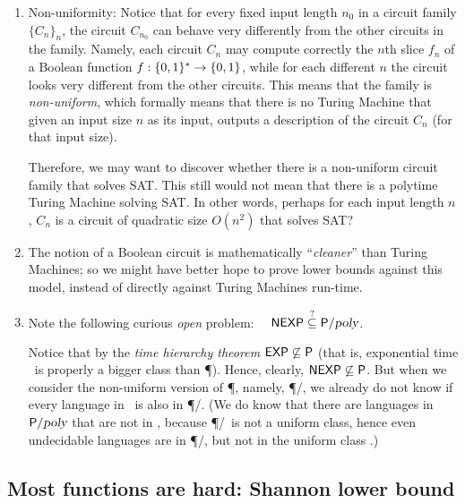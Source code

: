 \begin{enumerate}
\item  Non-uniformity: Notice that for every fixed input length $n_0$ in a circuit family $\{C_n\}_n$, the circuit $C_{n_0}$ can behave very differently from the other circuits in the family. Namely, each circuit $C_n$ may compute correctly the $n$th slice $f_n$ of a Boolean function $f:\{0,1\}^*\to\{0,1\}$, while for each different $n$ the circuit looks very different from the other circuits. This means that the family is \emph{non-uniform}, which  formally means that there is no Turing Machine that given an input size $n$ as its input, outputs a description of the circuit $C_n$ (for that input size). 

Therefore, we may want to discover whether there is a non-uniform circuit family that solves SAT. This still would not mean that there is a polytime Turing Machine solving SAT. In other words, perhaps for each input length $n$, $C_n$ is a circuit of quadratic size $O(n^2)$ that solves SAT?


\item The notion of a Boolean circuit is mathematically ``\textit{cleaner}'' than Turing Machines; so we might have better hope to prove lower bounds against this model, instead of directly against Turing Machines run-time. 

\item 
Note the following curious \emph{open} problem: $\quad {\ensuremath{\mathsf{NEXP}}}\stackrel{?}{\subseteq}{\mathsf{P}}/{\textsl{poly}}$.

Notice that by the \emph{time hierarchy theorem} ${\mathsf{EXP}}\not\subseteq {\ensuremath{\mathsf{P}}}$ (that is, exponential time \EXP\ is properly a bigger class than \P). Hence, clearly, ${\mathsf{NEXP}}\not\subseteq{\ensuremath{\mathsf{P}}}$. But when we consider the non-uniform version of \P, namely, \P/\poly, we already do not know if every  language in \NEXP\ is also in \P/\poly. (We do know that there are languages in ${\mathsf{P}}/{\textsl{poly}}$ that are not in \NEXP, because \P/\poly\ is not a uniform class, hence even undecidable languages are in \P/\poly, but not in the uniform class \NEXP.)  




\end{enumerate}

\subsection{Most functions are hard: Shannon lower bound}

